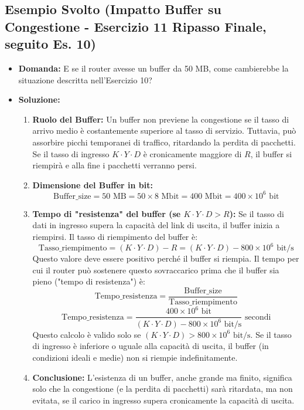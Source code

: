 \subsection{Esempio Svolto (Impatto Buffer su Congestione - Esercizio 11 Ripasso Finale, seguito Es. 10)}
\begin{itemize}
    \item \textbf{Domanda:} E se il router avesse un buffer da 50 MB, come cambierebbe la situazione descritta nell'Esercizio 10?
    \item \textbf{Soluzione:}
    \begin{enumerate}
        \item \textbf{Ruolo del Buffer:}
        Un buffer non previene la congestione se il tasso di arrivo medio è costantemente superiore al tasso di servizio. Tuttavia, può assorbire picchi temporanei di traffico, ritardando la perdita di pacchetti. Se il tasso di ingresso $K \cdot Y \cdot D$ è cronicamente maggiore di $R$, il buffer si riempirà e alla fine i pacchetti verranno persi.
        \item \textbf{Dimensione del Buffer in bit:}
        \[ \text{Buffer\_size} = 50 \text{ MB} = 50 \times 8 \text{ Mbit} = 400 \text{ Mbit} = 400 \times 10^6 \text{ bit} \]
        \item \textbf{Tempo di "resistenza" del buffer (se $K \cdot Y \cdot D > R$):}
        Se il tasso di dati in ingresso supera la capacità del link di uscita, il buffer inizia a riempirsi. Il tasso di riempimento del buffer è:
        \[ \text{Tasso\_riempimento} = (K \cdot Y \cdot D) - R = (K \cdot Y \cdot D) - 800 \times 10^6 \text{ bit/s} \]
        Questo valore deve essere positivo perché il buffer si riempia.
        Il tempo per cui il router può sostenere questo sovraccarico prima che il buffer sia pieno ("tempo di resistenza") è:
        \[ \text{Tempo\_resistenza} = \frac{\text{Buffer\_size}}{\text{Tasso\_riempimento}} \]
        \[ \text{Tempo\_resistenza} = \frac{400 \times 10^6 \text{ bit}}{(K \cdot Y \cdot D) - 800 \times 10^6 \text{ bit/s}} \text{ secondi} \]
        Questo calcolo è valido solo se $(K \cdot Y \cdot D) > 800 \times 10^6 \text{ bit/s}$. Se il tasso di ingresso è inferiore o uguale alla capacità di uscita, il buffer (in condizioni ideali e medie) non si riempie indefinitamente.
        \item \textbf{Conclusione:}
        L'esistenza di un buffer, anche grande ma finito, significa solo che la congestione (e la perdita di pacchetti) sarà ritardata, ma non evitata, se il carico in ingresso supera cronicamente la capacità di uscita.
    \end{enumerate}
\end{itemize}


